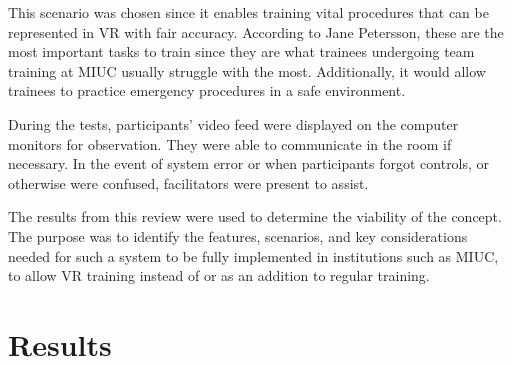 \documentclass[conference]{IEEEtran}
\begin{document}
This scenario was chosen since it enables training vital procedures that can be represented in VR with fair accuracy. According to Jane Petersson, these are the most important tasks to train since they are what trainees undergoing team training at MIUC usually struggle with the most. Additionally, it would allow trainees to practice emergency procedures in a safe environment.


During the tests, participants' video feed were displayed on the computer monitors for observation. They were able to communicate in the room if necessary. In the event of system error or when participants forgot controls, or otherwise were confused, facilitators were present to assist. 


The results from this review were used to determine the viability of the concept. The purpose was to identify the features, scenarios, and key considerations needed for such a system to be fully implemented in institutions such as MIUC, to allow VR training instead of or as an addition to regular training.


\section{Results}
%
%



%
%
\end{document}
